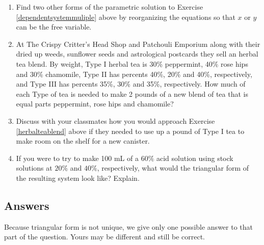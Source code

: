 \documentclass{ximera}
\begin{document}
\begin{enumerate}
\setcounter{enumi}{\value{HW}}

\item Find two other forms of the parametric solution to Exercise \ref{dependentsystemmuliple} above by reorganizing the equations so that $x$ or $y$ can be the free variable.

\item \label{herbalteablend} At The Crispy Critter's Head Shop and Patchouli Emporium along with their dried up weeds, sunflower seeds and astrological postcards they sell an herbal tea blend.  By weight, Type I herbal tea is 30\% peppermint, 40\% rose hips and 30\% chamomile, Type II has percents 40\%, 20\% and 40\%, respectively, and Type III has percents 35\%, 30\% and 35\%, respectively.  How much of each Type of tea is needed to make 2 pounds of a new blend of tea that is equal parts peppermint, rose hips and chamomile?  

\item Discuss with your classmates how you would approach Exercise \ref{herbalteablend} above if they needed to use up a pound of Type I tea to make room on the shelf for a new canister.

\item If you were to try to make 100 mL of a $60\%$ acid solution using stock solutions at $20\%$ and $40\%$, respectively, what would the triangular form of the resulting system look like?  Explain.

\end{enumerate}

\newpage

\subsection{Answers}


Because triangular form is not unique, we give only one possible answer to that part of the question.  Yours may be different and still be correct.
\end{document}
